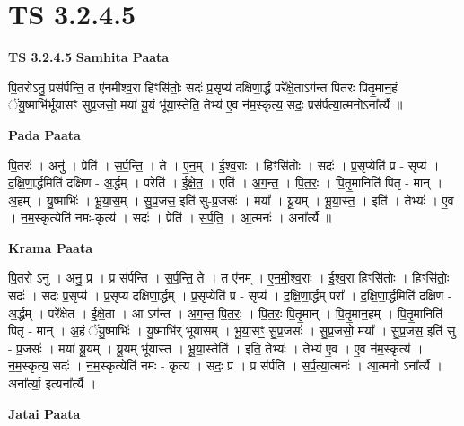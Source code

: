 \documentclass[17pt]{extarticle}
\begin{document}

\section{ TS 3.2.4.5 }

\textbf{TS 3.2.4.5 } \newline
\textbf{Samhita Paata} \newline

पि॒तरोऽनु॒ प्रस॑र्पन्ति॒ त ए॑नमीश्व॒रा हिꣳसि॑तोः॒ सदः॑ प्र॒सृप्य॑ दक्षिणा॒र्द्धं परे᳚क्षे॒ताऽग॑न्त पितरः पितृ॒मान॒हं ॅयु॒ष्माभि॑र्भूयासꣳ सुप्र॒जसो॒ मया॑ यू॒यं भू॑या॒स्तेति॒ तेभ्य॑ ए॒व न॑म॒स्कृत्य॒ सदः॒ प्रस॑र्पत्या॒त्मनोऽना᳚र्त्यै ॥ \newline

\textbf{Pada Paata} \newline

पि॒तरः॑ । अनु॑ । प्रेति॑ । स॒र्प॒न्ति॒ । ते । ए॒न॒म् । ई॒श्व॒राः । हिꣳसि॑तोः । सदः॑ । प्र॒सृप्येति॑ प्र - सृप्य॑ । द॒क्षि॒णा॒र्द्धमिति॑ दक्षिण - अ॒र्द्धम् । परेति॑ । ई॒क्षे॒त॒ । एति॑ । अ॒ग॒न्त॒ । पि॒त॒रः॒ । पि॒तृ॒मानिति॑ पितृ - मान् । अ॒हम् । यु॒ष्माभिः॑ । भू॒या॒स॒म् । सु॒प्र॒जस॒ इति॑ सु-प्र॒जसः॑ । मया᳚ । यू॒यम् । भू॒या॒स्त॒ । इति॑ । तेभ्यः॑ । ए॒व । न॒म॒स्कृत्येति॑ नमः-कृत्य॑ । सदः॑ । प्रेति॑ । स॒र्प॒ति॒ । आ॒त्मनः॑ । अना᳚र्त्यै ॥  \newline


\textbf{Krama Paata} \newline

पि॒तरो ऽनु॑ । अनु॒ प्र । प्र स॑र्पन्ति । स॒र्प॒न्ति॒ ते । त ए॑नम् । ए॒न॒मी॒श्व॒राः । ई॒श्व॒रा हिꣳसि॑तोः । हिꣳसि॑तोः॒ सदः॑ । सदः॑ प्र॒सृप्य॑ । प्र॒सृप्य॑ दक्षिणा॒र्द्धम् । प्र॒सृप्येति॑ प्र - सृप्य॑ । द॒क्षि॒णा॒र्द्धम् परा᳚ । द॒क्षि॒णा॒र्द्धमिति॑ दक्षिण - अ॒र्द्धम् । परे᳚क्षेत । ई॒क्षे॒ता । आ ऽग॑न्त । अ॒ग॒न्त॒ पि॒त॒रः॒ । पि॒त॒रः॒ पि॒तृ॒मान् । पि॒तृ॒मान॒हम् । पि॒तृ॒मानिति॑ पितृ - मान् । अ॒हं ॅयु॒ष्माभिः॑ । यु॒ष्माभि॑र् भूयासम् । भू॒या॒सꣳ॒॒ सु॒प्र॒जसः॑ । सु॒प्र॒जसो॒ मया᳚ । सु॒प्र॒जस॒ इति॑ सु - प्र॒जसः॑ । मया॑ यू॒यम् । यू॒यम् भू॑यास्त । भू॒या॒स्तेति॑ । इति॒ तेभ्यः॑ । तेभ्य॑ ए॒व । ए॒व न॑म॒स्कृत्य॑ । न॒म॒स्कृत्य॒ सदः॑ । न॒म॒स्कृत्येति॑ नमः - कृत्य॑ । सदः॒ प्र । प्र स॑र्पति । स॒र्प॒त्या॒त्मनः॑ । आ॒त्मनो ऽना᳚र्त्यै । अना᳚र्त्या॒ इत्यना᳚र्त्यै । \newline

\textbf{Jatai Paata} \newline
\end{document}
